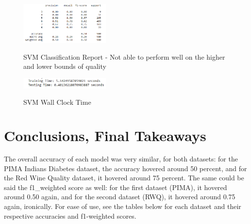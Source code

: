 \documentclass[conference]{IEEEtran}
\begin{document}
\begin{figure}[H]
    \centering
    \includegraphics[width=0.40\textwidth]{Red Wine Quality Graph Images/SVC/svm cr.png}
    \label{fig:enter-label}
    \caption{SVM Classification Report - Not able to perform well on the higher and lower bounds of quality}
\end{figure}

\begin{figure}[H]
    \centering
    \includegraphics[width=0.40\textwidth]{Red Wine Quality Graph Images/SVC/svm wct.png}
    \label{fig:enter-label}
    \caption{SVM Wall Clock Time}
\end{figure}

\section{Conclusions, Final Takeaways}
The overall accuracy of each model was very similar, for both datasets: for the PIMA Indians Diabetes dataset, the accuracy hovered around 50 percent, and for the Red Wine Quality dataset, it hovered around 75 percent. The same could be said the f1\_weighted score as well: for the first dataset (PIMA), it hovered around 0.50 again, and for the second dataset (RWQ), it hovered around 0.75 again, ironically. For ease of use, see the tables below for each dataset and their respective accuracies and f1-weighted scores.



\cite{cortez2009red}
\cite{smith1988pima}
\end{document}
